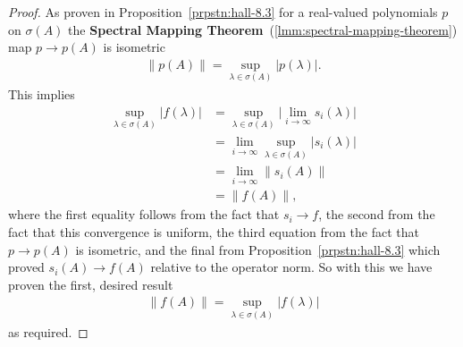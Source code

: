 \begin{proof}
As proven in Proposition~\ref{prpstn:hall-8.3} for a real-valued polynomials $p$ on $\sigma(A)$ the \textbf{Spectral Mapping Theorem}~(\ref{lmm:spectral-mapping-theorem}) map $p \rightarrow p(A)$ is isometric
\begin{align}
    \|p(A)\| = \sup\limits_{\lambda \in \sigma(A)} \lvert p(\lambda) \rvert.
\end{align}
This implies
\begin{align}
    \sup\limits_{\lambda \in \sigma(A)} \lvert f(\lambda) \rvert
    &= \sup\limits_{\lambda \in \sigma(A)} \lvert \lim_{i \rightarrow \infty} s_i (\lambda) \rvert \\
    &= \lim_{i \rightarrow \infty} \sup\limits_{\lambda \in \sigma(A)} \lvert s_i (\lambda) \rvert \\
    &= \lim_{i \rightarrow \infty} \| s_i(A) \| \\
    &= \| f(A) \|,
\end{align}
where the first equality follows from the fact that $s_i \rightarrow f$, the second from the fact that this convergence is uniform, the third equation from the fact that $p \rightarrow p(A)$ is isometric, and the final from Proposition~\ref{prpstn:hall-8.3} which proved $s_i(A) \rightarrow f(A)$ relative to the operator norm. So with this we have proven the first, desired result
\begin{align}
    \| f(A) \| = \sup\limits_{\lambda \in \sigma(A)} \lvert f(\lambda) \rvert
\end{align}
as required.
\end{proof}

